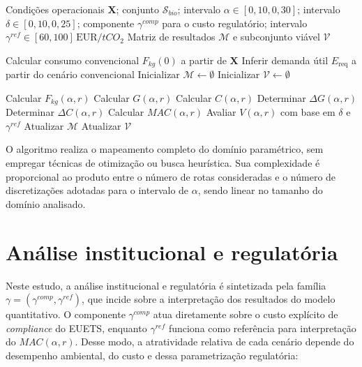 \begin{algorithm}[H]
\caption{Procedimento determinístico de avaliação paramétrica da viabilidade do biobunker}
\label{alg:biobunker}
\begin{algorithmic}[1]

\Require Condições operacionais $\mathbf{X}$; conjunto $\mathcal{S}_{bio}$; intervalo $\alpha \in [0{,}10,0{,}30]$; intervalo $\delta \in [0{,}10,0{,}25]$; componente $\gamma^{comp}$ para o custo regulatório; intervalo $\gamma^{ref} \in [60,100]\,\text{EUR}/tCO_2$
\Ensure Matriz de resultados $\mathcal{M}$ e subconjunto viável $\mathcal{V}$

\State Calcular consumo convencional $F_{kg}(0)$ a partir de $\mathbf{X}$
\State Inferir demanda útil $E_{\text{req}}$ a partir do cenário convencional
\State Inicializar $\mathcal{M} \gets \emptyset$
\State Inicializar $\mathcal{V} \gets \emptyset$

        \State Calcular $F_{kg}(\alpha,r)$
        \State Calcular $G(\alpha,r)$
        \State Calcular $C(\alpha,r)$
        \State Determinar $\Delta G(\alpha,r)$
        \State Determinar $\Delta C(\alpha,r)$
        \State Calcular $MAC(\alpha,r)$
        \State Avaliar $V(\alpha,r)$ com base em $\delta$ e $\gamma^{ref}$
        \State Atualizar $\mathcal{M}$
            \State Atualizar $\mathcal{V}$
        \EndIf
    \EndFor
\EndFor

\end{algorithmic}
\end{algorithm}

O algoritmo realiza o mapeamento completo do domínio paramétrico, sem empregar técnicas de otimização ou busca heurística. Sua complexidade é proporcional ao produto entre o número de rotas consideradas e o número de discretizações adotadas para o intervalo de $\alpha$, sendo linear no tamanho do domínio analisado.

\section{Análise institucional e regulatória}

Neste estudo, a análise institucional e regulatória é sintetizada pela família $\gamma = (\gamma^{comp},\gamma^{ref})$, que incide sobre a interpretação dos resultados do modelo quantitativo. O componente $\gamma^{comp}$ atua diretamente sobre o custo explícito de \emph{compliance} do \gls{EUETS}, enquanto $\gamma^{ref}$ funciona como referência para interpretação do $MAC(\alpha,r)$. Desse modo, a atratividade relativa de cada cenário depende do desempenho ambiental, do custo e dessa parametrização regulatória:

